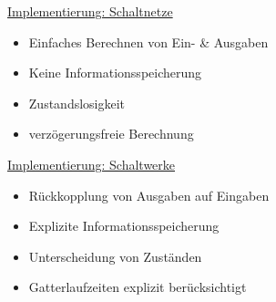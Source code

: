 \documentclass[12pt]{report}
\begin{document}
\begin{figure}[H]
  \begin{minipage}[t]{0.48\textwidth}
    \centering
    \underline{Implementierung: Schaltnetze}

    \begin{itemize}
      \item Einfaches Berechnen von Ein- \& Ausgaben
      \item Keine Informationsspeicherung
      \item Zustandslosigkeit
      \item verzögerungsfreie Berechnung
    \end{itemize}
  \end{minipage}
  \hfill
  \begin{minipage}[t]{0.48\textwidth}
    \centering
    \underline{Implementierung: Schaltwerke}

    \begin{itemize}
      \item Rückkopplung von Ausgaben auf Eingaben
      \item Explizite Informationsspeicherung
      \item Unterscheidung von Zuständen
      \item Gatterlaufzeiten explizit berücksichtigt
    \end{itemize}

  \end{minipage}
\end{figure}
\end{document}
